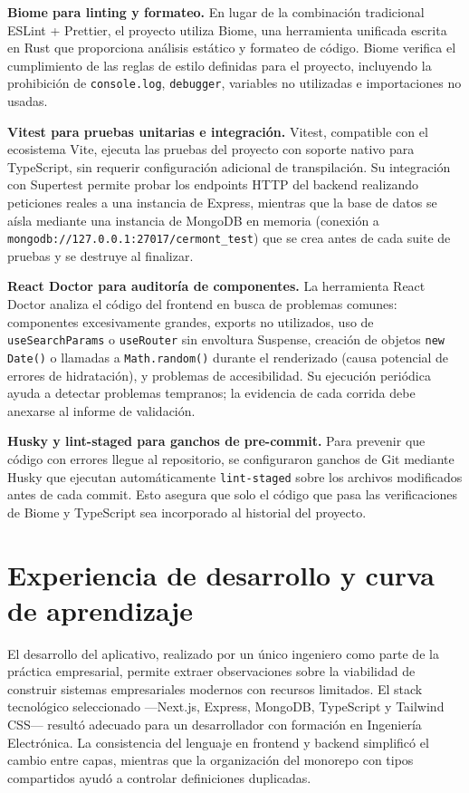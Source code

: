 \textbf{Biome para linting y formateo.} En lugar de la combinación tradicional ESLint + Prettier, el proyecto utiliza Biome, una herramienta unificada escrita en Rust que proporciona análisis estático y formateo de código. Biome verifica el cumplimiento de las reglas de estilo definidas para el proyecto, incluyendo la prohibición de \texttt{console.log}, \texttt{debugger}, variables no utilizadas e importaciones no usadas.

\textbf{Vitest para pruebas unitarias e integración.} Vitest, compatible con el ecosistema Vite, ejecuta las pruebas del proyecto con soporte nativo para TypeScript, sin requerir configuración adicional de transpilación. Su integración con Supertest permite probar los endpoints HTTP del backend realizando peticiones reales a una instancia de Express, mientras que la base de datos se aísla mediante una instancia de MongoDB en memoria (conexión a \texttt{mongodb://127.0.0.1:27017/cermont\_test}) que se crea antes de cada suite de pruebas y se destruye al finalizar.

\textbf{React Doctor para auditoría de componentes.} La herramienta React Doctor analiza el código del frontend en busca de problemas comunes: componentes excesivamente grandes, exports no utilizados, uso de \texttt{useSearchParams} o \texttt{useRouter} sin envoltura Suspense, creación de objetos \texttt{new Date()} o llamadas a \texttt{Math.random()} durante el renderizado (causa potencial de errores de hidratación), y problemas de accesibilidad. Su ejecución periódica ayuda a detectar problemas tempranos; la evidencia de cada corrida debe anexarse al informe de validación.

\textbf{Husky y lint-staged para ganchos de pre-commit.} Para prevenir que código con errores llegue al repositorio, se configuraron ganchos de Git mediante Husky que ejecutan automáticamente \texttt{lint-staged} sobre los archivos modificados antes de cada commit. Esto asegura que solo el código que pasa las verificaciones de Biome y TypeScript sea incorporado al historial del proyecto.

\section{Experiencia de desarrollo y curva de aprendizaje}
\label{sec:experiencia-desarrollo}

El desarrollo del aplicativo, realizado por un único ingeniero como parte de la práctica empresarial, permite extraer observaciones sobre la viabilidad de construir sistemas empresariales modernos con recursos limitados. El stack tecnológico seleccionado —Next.js, Express, MongoDB, TypeScript y Tailwind CSS— resultó adecuado para un desarrollador con formación en Ingeniería Electrónica. La consistencia del lenguaje en frontend y backend simplificó el cambio entre capas, mientras que la organización del monorepo con tipos compartidos ayudó a controlar definiciones duplicadas.

